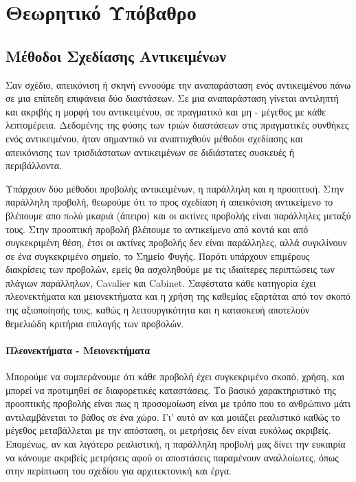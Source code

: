 \chapter{Θεωρητικό Υπόβαθρο}

\vspace{3em}

\section{Μέθοδοι Σχεδίασης Αντικειμένων}

Σαν σχέδιο, απεικόνιση ή σκηνή εννοούμε την αναπαράσταση ενός αντικειμένου πάνω σε μια επίπεδη επιφάνεια δύο διαστάσεων. Σε μια αναπαράσταση γίνεται αντιληπτή και ακριβής η μορφή του αντικειμένου, σε πραγματικό και μη - μέγεθος με κάθε λεπτομέρεια. Δεδομένης της φύσης των τριών διαστάσεων στις πραγματικές συνθήκες ενός αντικειμένου, ήταν σημαντικό να αναπτυχθούν μέθοδοι σχεδίασης και απεικόνισης των τρισδιάστατων αντικειμένων σε διδιάστατες συσκευές ή περιβάλλοντα.

Υπάρχουν δύο μέθοδοι προβολής αντικειμένων, η παράλληλη και η προοπτική. Στην παράλληλη προβολή, θεωρούμε ότι το προς σχεδίαση ή απεικόνιση αντικείμενο το βλέπουμε απο πoλύ μκαριά (άπειρο) και οι ακτίνες προβολής είναι παράλληλες μεταξύ τους. Στην προοπτική προβολή βλέπουμε το αντικείμενο από κοντά και από συγκεκριμένη θέση, έτσι οι ακτίνες προβολής δεν είναι παράλληλες, αλλά συγκλίνουν σε ένα συγκεκριμένο σημείο, το Σημείο Φυγής. Παρότι υπάρχουν επιμέρους διακρίσεις των προβολών, εμείς θα ασχοληθούμε με τις ιδιαίτερες περιπτώσεις των πλάγιων παράλληλων, Cavalier και Cabinet. Σαφέστατα κάθε κατηγορία έχει πλεονεκτήματα και μειονεκτήματα και η χρήση της καθεμίας εξαρτάται από τον σκοπό της αξιοποίησής τους, καθώς η λειτουργικότητα και η κατασκευή αποτελούν θεμελιώδη κριτήρια επιλογής των προβολών. 

\subsubsection{Πλεονεκτήματα - Μειονεκτήματα}

Μπορούμε να συμπεράνουμε ότι κάθε προβολή έχει συγκεκριμένο σκοπό, χρήση, και μπορεί να προτιμηθεί σε διαφορετικές καταστάσεις. Το βασικό χαρακτηριστικό της προοπτικής προβολής είναι πως η προσομοίωση είναι με τρόπο που το ανθρώπινο μάτι αντιλαμβάνεται το βάθος σε ένα χώρο. Γι' αυτό αν και μοιάζει ρεαλιστικό καθώς το μέγεθος μεταβάλλεται με την απόσταση, οι μετρήσεις δεν είναι ευκόλως ακριβείς. Επομένως, αν και λιγότερο ρεαλιστική, η παράλληλη προβολή μας δίνει την ευκαιρία να κάνουμε ακριβείς μετρήσεις αφού οι αποστάσεις παραμένουν αναλλοίωτες, όπως στην περίπτωση του σχεδίου για αρχιτεκτονική και έργα. 

